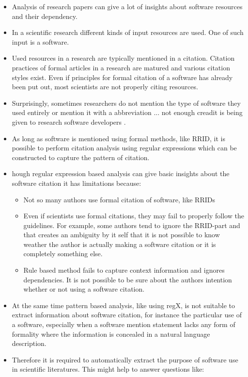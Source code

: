\begin{itemize}
    \item Analysis of research papers can give a lot of insights about software resources and their dependency. 
    \item In a scientific research different kinds of input resources are used. One of such input is a software. 
    \item Used resources in a research are typically mentioned in a citation. Citation practices of formal articles in a research are matured and various citation styles exist. Even if principles  for formal citation of a software has already been put out, most scientists are not properly citing resources.  
	\item Surprisingly, sometimes researchers do not mention the type of software they used entirely or mention it with a abbreviation ... not enough creadit is being given to research software developers .
	\item As long as software is mentioned using formal methods, like RRID, it is possible to perform citation analysis using regular expressions which can be constructed to capture the pattern of citation.
	\item hough regular expression based analysis can give basic insights about the software citation it has limitations because:
			
			\begin{itemize}
				\item Not so many authors use formal citation of software, like RRIDs
				\item Even if scientists use formal citations, they may fail to properly follow the guidelines. For example, some authors tend to ignore the RRID-part and that creates an ambiguity by it self that it is not possible to know weather the author is actually making a software citation or it is completely something else. 
				\item Rule based method fails to capture context information and ignores dependencies. It is not possible to be sure about the authors intention whether or not using a software citation. 

			\end{itemize}

	\item At the same time pattern based analysis, like using regX, is not suitable to extract information about software citation, for instance the particular use of a software, especially when a software mention statement lacks any form of formality where the information is concealed in a natural language description. 
	\item Therefore it is required to automatically extract the purpose of software use in scientific literatures. This might help to answer questions like:
		

\end{itemize}
